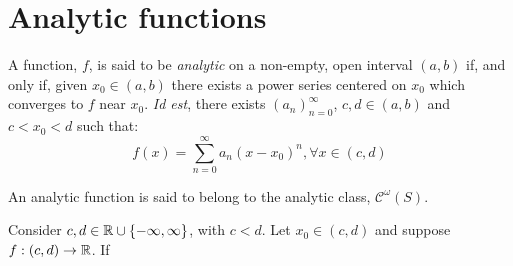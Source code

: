 \section{Analytic functions}

\begin{definition}
    A function, $f$, is said to be \emph{analytic} on a non-empty, open interval $(a,b)$ if, and only if, given $x_0 \in (a,b)$ there exists a power series centered on $x_0$ which converges to $f$ near $x_0$. \emph{Id est}, there exists $(a_n)_{n=0}^\infty$, $c, d \in (a,b)$ and $c < x_0 < d$ such that:
    \begin{equation*}
        f(x) = \sum \limits_{n=0}^\infty a_n (x - x_0)^n, \forall x \in (c,d)
    \end{equation*}
\end{definition}

\begin{remark}
    An analytic function is said to belong to the analytic class, $\mathcal{C}^\omega(S)$.
\end{remark}

\begin{theorem}
    Consider $c, d \in \mathbb{R} \cup \{-\infty, \infty\}$, with $c < d$. Let $x_0 \in (c,d)$ and suppose $f: (c,d) \to \mathbb{R}$. If 
\end{theorem}